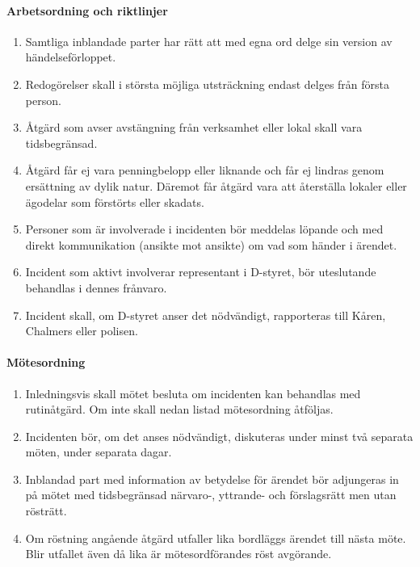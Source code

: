 \documentclass{dtek}
\begin{document}
\paragraph{Arbetsordning och riktlinjer}
\begin{enumerate}[resume]
  \item Samtliga inblandade parter har rätt att med egna ord delge sin version av händelseförloppet.
  \item Redogörelser skall i största möjliga utsträckning endast delges från första person.
  \item Åtgärd som avser avstängning från verksamhet eller lokal skall vara tidsbegränsad.
  \item Åtgärd får ej vara penningbelopp eller liknande och får ej lindras genom ersättning av dylik natur. Däremot får åtgärd vara att återställa lokaler eller ägodelar som förstörts eller skadats.
  \item Personer som är involverade i incidenten bör meddelas löpande och med direkt kommunikation (ansikte mot ansikte) om vad som händer i ärendet.
  \item Incident som aktivt involverar representant i D-styret, bör uteslutande behandlas i dennes frånvaro.
  \item Incident skall, om D-styret anser det nödvändigt, rapporteras till Kåren, Chalmers eller polisen.
\end{enumerate}

\paragraph{Mötesordning}
\begin{enumerate}[resume]
  \item Inledningsvis skall mötet besluta om incidenten kan behandlas med rutinåtgärd. Om inte skall nedan listad mötesordning åtföljas.
  \item Incidenten bör, om det anses nödvändigt, diskuteras under minst två separata möten, under separata dagar.
  \item Inblandad part med information av betydelse för ärendet bör adjungeras in på mötet med tidsbegränsad närvaro-, yttrande- och förslagsrätt men utan rösträtt.
  \item Om röstning angående åtgärd utfaller lika bordläggs ärendet till nästa möte. Blir utfallet även då lika är mötesordförandes röst avgörande.
\end{enumerate}
\end{document}
